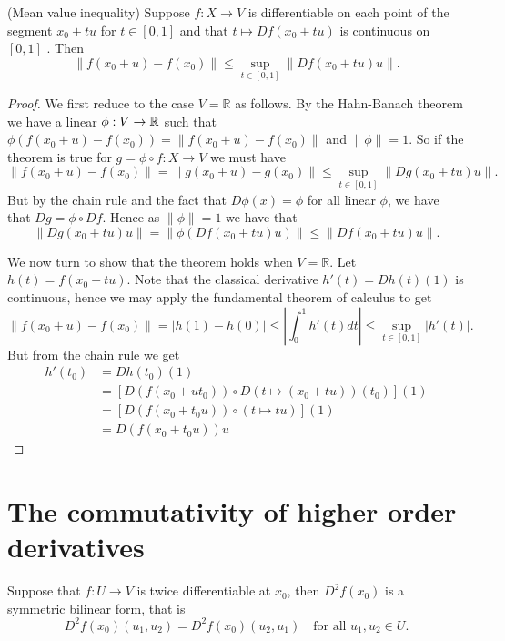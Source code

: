 \documentclass[twoside, a4paper, 10pt]{amsart}
\begin{document}
\begin{lemma}(Mean value inequality) Suppose $f:X \to V$ is differentiable on each point of the segment $x_0 + tu$ for $t \in [0,1]$ and that $t \mapsto Df(x_0 + tu)$ is continuous on $[0,1]$ . Then $$\| f(x_0 + u) - f(x_0) \| \leq \sup_{t \in [0,1]} \| Df(x_0 + tu) u \|.$$ \end{lemma}

\begin{proof} We first reduce to the case $V = \mathbb{R}$ as follows. By the Hahn-Banach theorem we have a linear $\phi:V \to \mathbb{R}$ such that $\phi (f(x_0 + u) - f(x_0)) = \| f(x_0 + u) - f(x_0) \|$ and $\|\phi \| = 1$. So if the theorem is true for $g = \phi \circ f: X \to V$ we must have $$\|f(x_0+ u) -f(x_0)\| = \|g(x_0 + u) - g(x_0) \| \leq \sup_{t \in [0,1]} \| Dg(x_0 + tu) u \|.$$ But by the chain rule and the fact that $D\phi(x) = \phi$ for all linear $\phi$, we have that $Dg = \phi \circ Df$. Hence as $\|\phi \| = 1$ we have that $$\|Dg(x_0 +tu)u \| = \| \phi \left( Df(x_0+tu)u \right) \| \leq \|Df(x_0+tu)u \|.$$ 

We now turn to show that the theorem holds when $V = \mathbb{R}$. Let $h(t) = f(x_0+tu)$. Note that the classical derivative $h'(t) = Dh(t) (1)$ is continuous, hence we may apply the fundamental theorem of calculus to get $$\| f(x_0 + u) - f(x_0) \| = |h(1) - h(0)| \leq |\int_{0}^1 h'(t) dt| \leq \sup_{t \in [0,1]}|h'(t)|.$$ But from the chain rule we get
\begin{align*} 
h'(t_0) &= Dh(t_0)(1) \\ 
&= \left[ D(f(x_0 + ut_0)) \circ D(t \mapsto (x_0 + tu))(t_0) \right](1) \\ 
&= \left[ D(f(x_0+t_0u)) \circ (t \mapsto tu) \right] (1) \\
&=D(f(x_0+t_0u)) u  \end{align*} \end{proof}

\section{The commutativity of higher order derivatives}

\begin{thm} Suppose that $f:U \to V$ is twice differentiable at $x_0$, then $D^2 f(x_0)$ is a symmetric bilinear form, that is $$D^2f(x_0)(u_1,u_2) = D^2f(x_0)(u_2,u_1) \quad \text{for all } u_1,u_2 \in U.$$  \end{thm}
\end{document}
